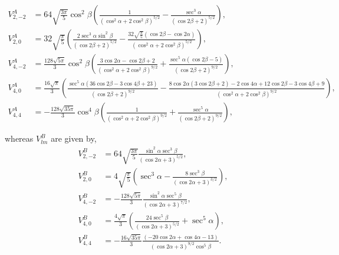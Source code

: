 \documentclass[a4paper,prb,twocolumn]{revtex4-1}  %
\newcommand{\rev}[1]{{\color{blue}{#1}}}
\newcommand{\az}[1]{{\color{magenta}{#1}}} %
\begin{document}
\begin{widetext}
\begin{align}
V^A_{2,-2}&= 64 \sqrt{\frac{3 \pi }{5}} \cos ^2\beta  \left(\frac{1}{\left(\cos ^2\alpha +2 \cos ^2\beta \right)^{5/2}}-\frac{\sec ^3\alpha }{(\cos 2 \beta +2)^{5/2}}\right),\\
V^A_{2,0}&= 32 \sqrt{\frac{\pi }{5}} \left(\frac{2 \sec ^3\alpha  \sin ^2\beta }{(\cos 2 \beta +2)^{5/2}}-\frac{32 \sqrt{\frac{\pi }{5}} (\cos 2 \beta -\cos 2 \alpha )}{\left(\cos ^2\alpha +2 \cos ^2\beta \right)^{5/2}}\right),\\
V^A_{4,-2}&= \frac{128\sqrt{5 \pi } }{3} \cos ^2\beta  \left(\frac{3 \cos 2 \alpha -\cos 2 \beta +2}{\left(\cos ^2\alpha +2 \cos ^2\beta \right)^{9/2}}+\frac{\sec ^5\alpha  (\cos 2 \beta -5)}{(\cos 2 \beta +2)^{9/2}}\right),\\ \nonumber
V^A_{4,0}&= \frac{16\sqrt{\pi } }{3} \left(
\frac{\sec ^5\alpha  (36 \cos 2 \beta -3 \cos 4 \beta +23)}{(\cos 2 \beta +2)^{9/2}}
-
\frac{8 \cos 2 \alpha  (3 \cos 2 \beta +2)-2 \cos 4 \alpha+12 \cos 2 \beta -3 \cos 4 \beta +9}{\left(\cos ^2\alpha +2 \cos ^2\beta \right)^{9/2}}
\right),\\
V^A_{4,4}&=-\frac{128\sqrt{35 \pi } }{3} \cos ^4\beta  \left(\frac{1}{\left(\cos ^2\alpha +2 \cos ^2\beta \right)^{9/2}}+\frac{\sec ^5\alpha }{(\cos 2 \beta +2)^{9/2}}\right),
\end{align}
\end{widetext}
whereas $V_{lm}^{B}$ are given by,
\begin{align}
V^{B}_{2,-2}&= 64 \sqrt{\frac{3 \pi }{5}}  \frac{\sin ^2\alpha  \sec ^3\beta }{(\cos 2 \alpha +3)^{5/2}},
 \\ V^{B}_{2,0}&=  4 \sqrt{\frac{\pi }{5}} \left(\sec ^3\alpha -\frac{8 \sec ^3\beta }{(\cos 2 \alpha +3)^{3/2}}\right),\\
 V^{B}_{4,-2}&=  - \frac{128 \sqrt{5 \pi } }{3} \frac{\sin ^2\alpha  \sec ^5\beta }{ (\cos 2 \alpha +3)^{7/2}},\\ 
V^{B}_{4,0}&= \frac{4\sqrt{\pi } }{3} \left(\frac{24 \sec ^5\beta }{(\cos 2 \alpha +3)^{5/2}}+\sec ^5\alpha \right),\\
 V^{B}_{4,4}&=  - \frac{16 \sqrt{35 \pi } }{3} \frac{(-20 \cos 2 \alpha +\cos 4 \alpha -13) %
 }
 {(\cos 2 \alpha +3)^{9/2} \cos^5\beta}.
 \end{align}
\end{document}
